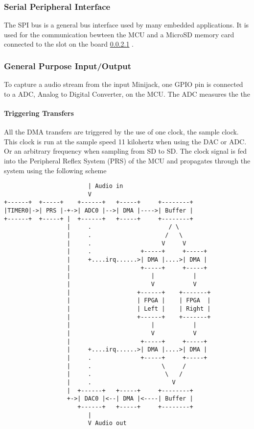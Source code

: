 \subsubsection{Serial Peripheral Interface}
The SPI bus is a general bus interface used by many embedded applications. It is used
for the communication bewteen the MCU and a MicroSD memory card connected to the slot
on the board \ref{} . 

\subsubsection{General Purpose Input/Output}
To capture a audio stream from the input Minijack, one GPIO pin is connected to a 
ADC, Analog to Digital Converter, on the MCU. The ADC measures the the 


\paragraph{Triggering Transfers}

All the DMA transfers are triggered by the use of one clock, the sample clock.
This clock is run at the sample speed 11 kilohertz when using the DAC or ADC. Or
an arbitrary frequency when sampling from SD to SD. The clock signal is fed into
the Peripheral Reflex System (PRS) of the MCU and propagates through the system
using the following scheme

\begin{verbatim}
                        | Audio in
                        V
+------+  +-----+    +------+   +-----+     +--------+
|TIMER0|->| PRS |-+->| ADC0 |-->| DMA |---->| Buffer |
+------+  +-----+ |  +------+   +-----+     +--------+
                  |     .                      / \
                  |     .                     /   \
                  |     .                    V     V
                  |     .              +-----+     +-----+
                  |     +....irq......>| DMA |....>| DMA |
                  |                    +-----+     +-----+
                  |                       |           |
                  |                       V           V
                  |                   +------+    +-------+
                  |                   | FPGA |    | FPGA  |
                  |                   | Left |    | Right |
                  |                   +------+    +-------+
                  |                       |           |
                  |                       V           V
                  |                    +-----+     +-----+
                  |     +....irq......>| DMA |....>| DMA |
                  |     .              +-----+     +-----+
                  |     .                    \     /
                  |     .                     \   /
                  |     .                       V
                  |  +------+   +-----+     +--------+
                  +->| DAC0 |<--| DMA |<----| Buffer |
                     +------+   +-----+     +--------+
                        |
                        V Audio out
\end{verbatim}

